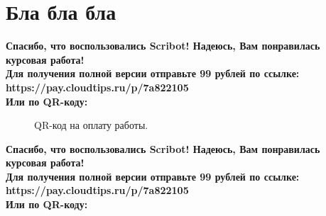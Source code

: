 \documentclass{article}
\begin{document}
\section{Бла бла бла}
\begin{center}
    \textbf{
        Спасибо, что воспользовались Scribot! Надеюсь, Вам понравилась курсовая работа!\\
        Для получения полной версии отправьте 99 рублей по ссылке:\\
        https://pay.cloudtips.ru/p/7a822105\\
        Или по QR-коду:\\
    }
\end{center}
\begin{figure}[h]
    \caption{QR-код на оплату работы.}
    \label{ris:image}
\end{figure}
\newpage
\begin{center}
    \textbf{
        Спасибо, что воспользовались Scribot! Надеюсь, Вам понравилась курсовая работа!\\
        Для получения полной версии отправьте 99 рублей по ссылке:\\
        https://pay.cloudtips.ru/p/7a822105\\
        Или по QR-коду:\\
    }
\end{center}
\end{document}
